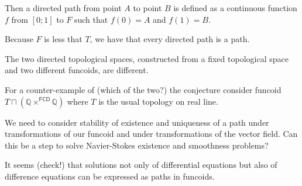 Then a directed path from point $A$ to point $B$ is defined as a continuous function $f$ from $[0;1]$ to $F$ such that $f(0)=A$ and $f(1)=B$.

Because $F$ is less that $T$, we have that every directed path is a path.

\begin{conjecture}
The two directed topological spaces, constructed from a fixed topological space and two different funcoids,
are different.
\end{conjecture}

For a counter-example of (which of the two?) the conjecture consider funcoid $T\sqcap(\mathbb{Q}\times^{\mathsf{FCD}}\mathbb{Q})$
where $T$ is the usual topology on real line.

We need to consider stability of existence and uniqueness of a path under transformations of our funcoid and
under transformations of the vector field. Can this be a step to solve Navier-Stokes existence and smoothness problems?

It seems (check!) that solutions not only of differential equations but also of difference equations can be
expressed as paths in funcoids.